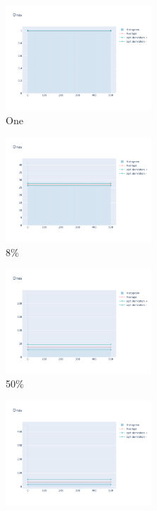 \documentclass[12pt, fleqn]{report}                             %
\theoremstyle{break}                                            %
\begin{document}
      \begin{figure}[ht!]
        \centering
        \begin{subfigure}[b]{0.4\linewidth}
          \includegraphics[width=0.6\textwidth]{Images/36/dia-a.png}
          \caption{One}
        \end{subfigure}
        \begin{subfigure}[b]{0.4\linewidth}
          \includegraphics[width=0.6\textwidth]{Images/36/dia-b.png}
          \caption{8\%}
        \end{subfigure}
        \begin{subfigure}[b]{0.4\linewidth}
          \includegraphics[width=0.6\textwidth]{Images/36/dia-c.png}
          \caption{50\%}
        \end{subfigure}
        \begin{subfigure}[b]{0.4\linewidth}
          \includegraphics[width=0.6\textwidth]{Images/36/dia-d.png}

\end{subfigure}
\end{figure}
\end{document}

